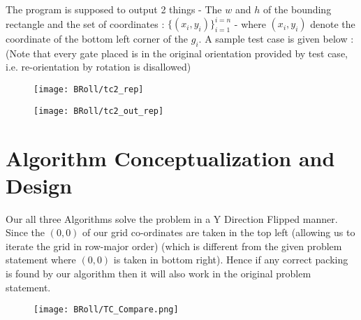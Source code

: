 \documentclass[12pt, a4paper,openany]{article}
\begin{document}
\begin{flushleft}
The program is supposed to output 2 things - The \(w\) and \(h\) of the bounding rectangle and the set of coordinates : \(\{ (x_{i},y_{i})\}^{i=n}_{i=1}\) - where \((x_{i},y_{i})\) denote the coordinate of the bottom left corner of the \(g_{i}\). A sample test case is given below :
(Note that every gate placed is in the original orientation provided by test case, i.e. re-orientation by rotation is disallowed)
\end{flushleft}

\begin{figure}[ht]
\centering
  \texttt{[image: BRoll/tc2\_rep]}
   \label{fig:TC2}
\end{figure}


\begin{figure}[ht]
  \centering
  \texttt{[image: BRoll/tc2\_out\_rep]}
  \label{fig:TC2_OUT}
\end{figure}

\section{Algorithm Conceptualization and Design}
\begin{flushleft}
Our all three Algorithms solve the problem in a Y Direction Flipped manner.
Since the \((0,0)\) of our grid co-ordinates are taken in the top left (allowing us to iterate the grid in row-major order)
(which is different from the given problem statement where \((0,0)\) is taken in bottom right). Hence if any
correct packing is found by our algorithm then it will also work in the original problem statement.
\end{flushleft}
\begin{figure}[ht]
  \centering
  \texttt{[image: BRoll/TC\_Compare.png]}
  \label{fig:TC_Compare}
\end{figure}

\newpage %
\end{document}
